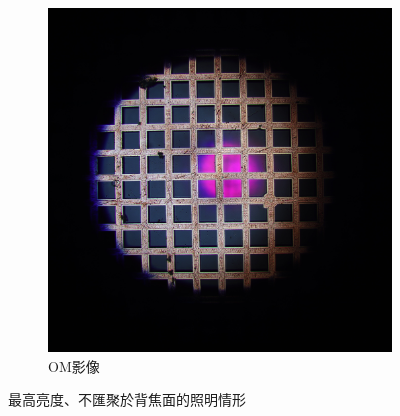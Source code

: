 \documentclass[12pt]{article}
\begin{document}
\begin{figure}
\begin{subfigure}[t]{0.45\textwidth}
        \includegraphics[width=\linewidth]{om_off_brighest.JPG}
        \caption{OM影像}
        \label{figure: brightest_off_om}
    \end{subfigure}
    \caption{最高亮度、不匯聚於背焦面的照明情形}
\end{figure}
\end{document}
